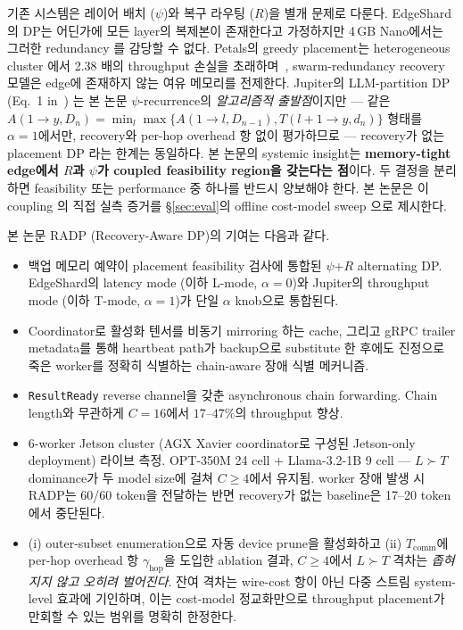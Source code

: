 \documentclass[10pt,twocolumn,a4paper]{article}
\newcommand{\sys}{RADP}
\begin{document}
기존 시스템은 레이어 배치 ($\psi$)와 복구 라우팅 ($R$)을
별개 문제로 다룬다. EdgeShard의 DP는 어딘가에 모든 layer의
복제본이 존재한다고 가정하지만 4\,GB Nano에서는 그러한 redundancy
를 감당할 수 없다. Petals의 greedy placement는 heterogeneous cluster
에서 2.38 배의 throughput 손실을 초래하며~\cite{mei2025helix},
swarm-redundancy recovery 모델은 edge에 존재하지 않는 여유 메모리를
전제한다. Jupiter의 LLM-partition DP (Eq.~1 in~\cite{ye2025jupiter})
는 본 논문 $\psi$-recurrence의 \emph{알고리즘적 출발점}이지만 ---
같은 $A(1\!\to\!y, D_n) = \min_l \max\{A(1\!\to\!l, D_{n-1}),
T(l{+}1\!\to\!y, d_n)\}$ 형태를 $\alpha\!=\!1$에서만, recovery와
per-hop overhead 항 없이 평가하므로 --- recovery가 없는 placement
DP 라는 한계는 동일하다. 본 논문의 systemic insight는
\textbf{memory-tight edge에서 $R$과 $\psi$가 coupled feasibility
region을 갖는다는 점}이다. 두 결정을 분리하면 feasibility 또는
performance 중 하나를 반드시 양보해야 한다. 본 논문은 이 coupling
의 직접 실측 증거를 \S\ref{sec:eval}의 offline cost-model sweep
으로 제시한다.

본 논문 \sys{} (Recovery-Aware DP)의 기여는 다음과 같다.
\begin{itemize}
  \item 백업 메모리 예약이 placement feasibility 검사에 통합된
        $\psi$+$R$ alternating DP. EdgeShard의 latency mode (이하
        L-mode, $\alpha\!=\!0$)와 Jupiter의 throughput mode (이하
        T-mode, $\alpha\!=\!1$)가 단일 $\alpha$ knob으로 통합된다.
  \item Coordinator로 활성화 텐서를 비동기 mirroring 하는
        cache, 그리고 gRPC trailer metadata를 통해 heartbeat path가
        backup으로 substitute 한 후에도 진정으로 죽은 worker를
        정확히 식별하는 chain-aware 장애 식별 메커니즘.
  \item \texttt{ResultReady} reverse channel을 갖춘 asynchronous
        chain forwarding. Chain length와 무관하게 $C\!=\!16$에서
        $17$--$47\%$의 throughput 향상.
  \item 6-worker Jetson cluster (AGX Xavier coordinator로 구성된
        Jetson-only deployment) 라이브 측정. OPT-350M 24 cell +
        Llama-3.2-1B 9 cell --- $L\!\succ\!T$ dominance가 두 model
        size에 걸쳐 $C\!\geq\!4$에서 유지됨. worker 장애 발생 시
        \sys{}는 60/60 token을 전달하는 반면 recovery가 없는
        baseline은 17--20 token에서 중단된다.
  \item (i) outer-subset enumeration으로 자동 device prune을 활성화하고
        (ii) $T_{\mathrm{comm}}$에 per-hop overhead 항
        $\gamma_{\mathrm{hop}}$을 도입한 ablation 결과,
        $C\!\geq\!4$에서 $L\!\succ\!T$ 격차는 \emph{좁혀지지 않고
        오히려 벌어진다}. 잔여 격차는 wire-cost 항이 아닌
        다중 스트림 system-level 효과에 기인하며, 이는 cost-model
        정교화만으로 throughput placement가 만회할 수 있는 범위를
        명확히 한정한다.
\end{itemize}
\end{document}
